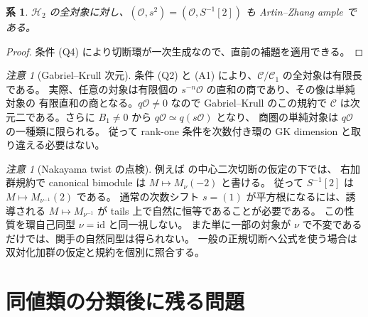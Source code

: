 \documentclass[a4paper,11pt]{ltjsarticle}
\numberwithin{equation}{section}
\theoremstyle{plain}
\newtheorem{corollary}[theorem]{系}
\theoremstyle{definition}
\theoremstyle{remark}
\newtheorem{remark}[theorem]{注意}
\newcommand{\OO}{\mathcal O}
\newcommand{\cC}{\mathcal C}
\newcommand{\HH}{\mathcal H_2}
\begin{document}
\begin{corollary}
$\HH$ の全対象に対し、$(\OO,s^2)=(\OO,S^{-1}[2])$ も
Artin--Zhang ample である。
\end{corollary}
\begin{proof}
条件 (Q4) により切断環が一次生成なので、直前の補題を適用できる。
\end{proof}

\begin{remark}[Gabriel--Krull 次元]
条件 (Q2) と (A1) により、$\cC/\cC_1$ の全対象は有限長である。
実際、任意の対象は有限個の $s^{-n}\OO$ の直和の商であり、その像は単純対象の
有限直和の商となる。$q\OO\ne0$ なので Gabriel--Krull のこの規約で
$\cC$ は次元二である。さらに $B_1\ne0$ から $q\OO\simeq q(s\OO)$ となり、
商圏の単純対象は $q\OO$ の一種類に限られる。
従って rank-one 条件を次数付き環の GK dimension と取り違える必要はない。
\end{remark}

\begin{remark}[Nakayama twist の点検]
\label{rem:nakayama}
例えば \cite[Section 5]{MU2021} の中心二次切断の仮定の下では、
右加群規約で canonical bimodule は $M\mapsto M_\nu(-2)$ と書ける。
従って $S^{-1}[2]$ は $M\mapsto M_{\nu^{-1}}(2)$ である。
通常の次数シフト $s=(1)$ が平方根になるには、誘導される
$M\mapsto M_{\nu^{-1}}$ が tails 上で自然に恒等であることが必要である。
この性質を環自己同型 $\nu=\mathrm{id}$ と同一視しない。
また単に一部の対象が $\nu$ で不変であるだけでは、関手の自然同型は得られない。
一般の正規切断へ公式を使う場合は双対化加群の仮定と規約を個別に照合する。
\end{remark}






















\section{同値類の分類後に残る問題}
\label{sec:open-problems}
\end{document}
